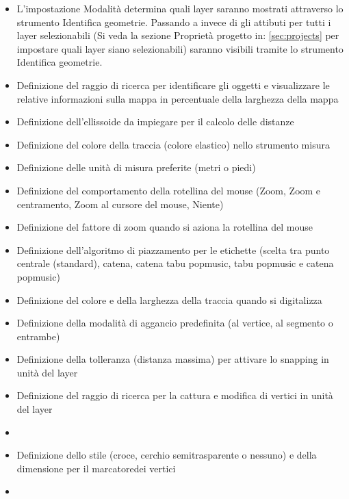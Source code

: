 \begin{itemize}
\item L'impostazione Modalità determina quali layer saranno mostrati attraverso
lo strumento Identifica geometrie. Passando a  invece di 
 gli attibuti per tutti i layer selezionabili
(Si veda la sezione Proprietà progetto in: \ref{sec:projects} per impostare quali
layer siano selezionabili) saranno visibili tramite lo strumento Identifica geometrie.
\item Definizione del raggio di ricerca per identificare gli oggetti e
visualizzare le relative informazioni sulla mappa in percentuale della
larghezza della mappa
\item Definizione dell'ellissoide da impiegare per il calcolo delle distanze
\item Definizione del colore della traccia (colore elastico) nello strumento
misura
\item Definizione delle unità di misura preferite (metri o piedi)
\item Definizione del comportamento della rotellina del mouse (Zoom, Zoom e
centramento, Zoom al cursore del mouse, Niente)
\item Definizione del fattore di zoom quando si aziona la rotellina del mouse
\end{itemize}


\begin{itemize}
\item Definizione dell'algoritmo di piazzamento per le etichette (scelta tra punto centrale
(standard), catena, catena tabu popmusic, tabu popmusic e catena popmusic)
\end{itemize}


\begin{itemize}
\item Definizione del colore e della larghezza della traccia quando si digitalizza
\item Definizione della modalità di aggancio predefinita (al vertice, al
segmento o entrambe)
\item Definizione della tolleranza (distanza massima) per attivare lo snapping
in unità del layer
\item Definizione del raggio di ricerca per la cattura e modifica di vertici
in unità del layer
\item {}
\item Definizione dello stile (croce, cerchio semitrasparente o nessuno) e della
dimensione per il marcatoredei vertici 
\item {}
\end{itemize}


